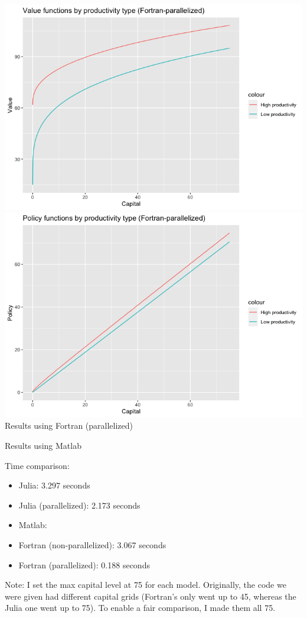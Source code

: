 \documentclass[12pt]{article}
\begin{document}
    \begin{center}
        \includegraphics[scale=0.4]{for_par_vf.png}\\
        \includegraphics[scale=0.4]{for_par_pf.png}\\
        Results using Fortran (parallelized)
    \end{center}
    \begin{center}
        Results using Matlab
    \end{center}
    Time comparison:
    \begin{itemize}
        \item Julia: 3.297 seconds
        \item Julia (parallelized): 2.173 seconds
        \item Matlab: 
        \item Fortran (non-parallelized): 3.067 seconds
        \item Fortran (parallelized): 0.188 seconds
    \end{itemize}
    Note: I set the max capital level at 75 for each model. Originally, the code we were given had different capital grids (Fortran's only went up to 45, whereas the Julia one went up to 75). To enable a fair comparison, I made them all 75.
\end{document}
